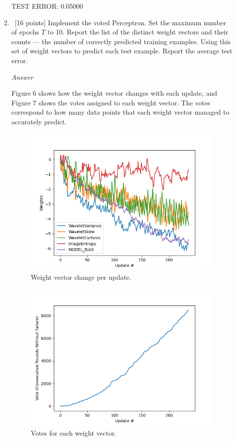 \documentclass[12pt, fullpage,letterpaper]{article}
\begin{document}
\begin{enumerate}
\begin{enumerate}
    TEST ERROR:   0.05000
	
	\item~[16 points] Implement the voted Perceptron. Set the maximum number of epochs $T$ to 10. Report the list of the distinct weight vectors and their counts --- the number of correctly predicted training examples. Using this set of weight vectors to predict each test example. Report the average test error. 
	
	\emph{Answer}
	
	Figure 6 shows how the weight vector changes with each update, and Figure 7 shows the votes assigned to each weight vector. The votes correspond to how many data points that each weight vector managed to accurately predict.
	
	\begin{figure}[htp]
        \centering
        \includegraphics[width=12cm]{q2b_weights_convergence.png}
        \caption{Weight vector change per update.}
        \label{fig:q2b_weights}
    \end{figure}
    
    \begin{figure}[htp]
        \centering
        \includegraphics[width=12cm]{q2b_votes.png}
        \caption{Votes for each weight vector.}
        \label{fig:q2b_votes}
    \end{figure}
	

\end{enumerate}
\end{enumerate}
\end{document}

